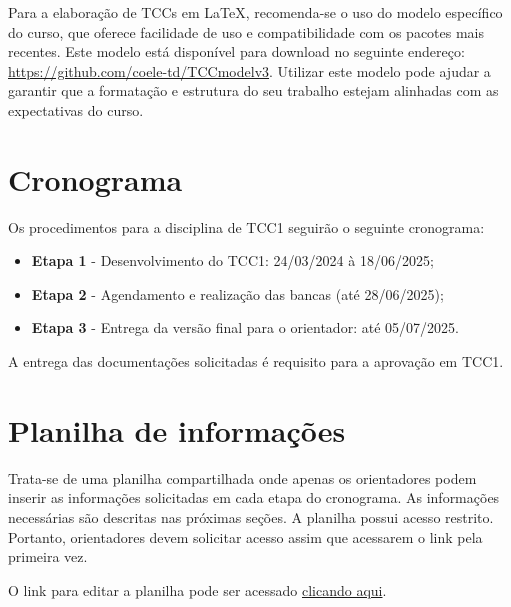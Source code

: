 \documentclass[a4paper, 12pt]{article}
\newcommand{\startdate}{24/03/2024}		%
\newcommand{\agendadate}{18/06/2025}	%
\newcommand{\bancadate}{28/06/2025}		%
\newcommand{\finaldate}{05/07/2025}		%
\begin{document}
	Para a elaboração de TCCs em \LaTeX{}, recomenda-se o uso do modelo específico do curso, que oferece facilidade de uso e compatibilidade com os pacotes mais recentes. Este modelo está disponível para download no seguinte endereço: \url{https://github.com/coele-td/TCCmodelv3}. Utilizar este modelo pode ajudar a garantir que a formatação e estrutura do seu trabalho estejam alinhadas com as expectativas do curso.


    \section{Cronograma}
    \label{sec:CRO}
    
    Os procedimentos para a disciplina de TCC1 seguirão o seguinte cronograma:
    \begin{itemize}
    	\item \textbf{Etapa 1} - Desenvolvimento do TCC1: \startdate{} à \agendadate;
    	\item \textbf{Etapa 2} - Agendamento  e realização das bancas (até \bancadate);
    	\item \textbf{Etapa 3} - Entrega da versão final para o orientador: até \finaldate.    	
    \end{itemize}

	A entrega das documentações solicitadas é requisito para a aprovação em TCC1.

	\section{Planilha de informações}
	\label{sec:pla}
	
	Trata-se de uma planilha compartilhada onde apenas os orientadores podem inserir as informações solicitadas em cada etapa do cronograma. As informações necessárias são descritas nas próximas seções. A planilha possui acesso restrito. Portanto, orientadores devem solicitar acesso assim que acessarem o link pela primeira vez.

	
	O link para editar a planilha pode ser acessado \href{https://docs.google.com/spreadsheets/d/1AfsG1P6wrw42CbZCDbQzsXFXmxfrMmZ7gpn8NvR8cq4/edit?usp=sharing}{clicando aqui}.
	
\end{document}
